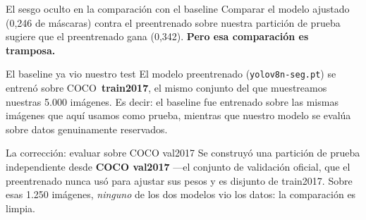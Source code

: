 \documentclass[aspectratio=169,11pt]{beamer}
\begin{document}
\begin{frame}{El sesgo oculto en la comparación con el baseline}
  Comparar el modelo ajustado (0,246 de máscaras) contra el preentrenado sobre nuestra
  partición de prueba sugiere que el preentrenado gana (0,342). \textbf{Pero esa
  comparación es tramposa.}

  \vspace{0.6em}
  \begin{alertblock}{El baseline ya vio nuestro test}
    \footnotesize
    El modelo preentrenado (\texttt{yolov8n-seg.pt}) se entrenó sobre COCO~\textbf{train2017},
    el mismo conjunto del que muestreamos nuestras 5.000 imágenes. Es decir: el baseline
    fue entrenado sobre las mismas imágenes que aquí usamos como prueba, mientras que
    nuestro modelo se evalúa sobre datos genuinamente reservados.
  \end{alertblock}

  \vspace{0.4em}
  \begin{exampleblock}{La corrección: evaluar sobre COCO val2017}
    \footnotesize
    Se construyó una partición de prueba independiente desde \textbf{COCO val2017} ---el
    conjunto de validación oficial, que el preentrenado nunca usó para ajustar sus pesos y
    es disjunto de train2017. Sobre esas 1.250 imágenes, \emph{ninguno} de los dos modelos
    vio los datos: la comparación es limpia.
  \end{exampleblock}
\end{frame}
\end{document}
